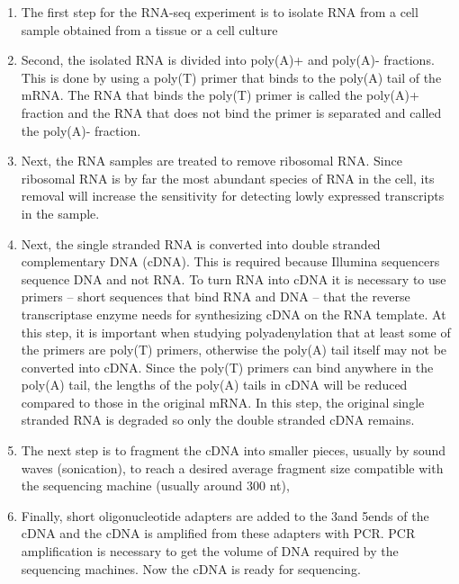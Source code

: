 \begin{enumerate}
	\item The first step for the RNA-seq experiment is to isolate RNA from a
		cell sample obtained from a tissue or a cell culture

	\item Second, the isolated RNA is divided into poly(A)+ and poly(A)-
		fractions. This is done by using a poly(T) primer that binds to the
		poly(A) tail of the mRNA. The RNA that binds the poly(T) primer is
		called the poly(A)+ fraction and the RNA that does not bind the primer
		is separated and called the poly(A)- fraction.

	\item Next, the RNA samples are treated to remove ribosomal RNA. Since
		ribosomal RNA is by far the most abundant species of RNA in the cell,
		its removal will increase the sensitivity for detecting lowly expressed
		transcripts in the sample.

	\item Next, the single stranded RNA is converted into double stranded
		complementary DNA (cDNA). This is required because Illumina sequencers
		sequence DNA and not RNA. To turn RNA into cDNA it is necessary to use
		primers -- short sequences that bind RNA and DNA -- that the reverse
		transcriptase enzyme needs for synthesizing cDNA on the RNA template.
		At this step, it is important when studying polyadenylation that at
		least some of the primers are poly(T) primers, otherwise the poly(A)
		tail itself may not be converted into cDNA. Since the poly(T) primers
		can bind anywhere in the poly(A) tail, the lengths of the poly(A) tails
		in cDNA will be reduced compared to those in the original mRNA. In this
		step, the original single stranded RNA is degraded so only the double
		stranded cDNA remains.

	\item The next step is to fragment the cDNA into smaller pieces, usually by
		sound waves (sonication), to reach a desired average fragment size
		compatible with the sequencing machine (usually around 300 nt),

	\item Finally, short oligonucleotide adapters are added to the 3\ppp and
		5\ppp ends of the cDNA and the cDNA is amplified from these adapters
		with PCR.  PCR amplification is necessary to get the volume of DNA
		required by the sequencing machines. Now the cDNA is ready for
		sequencing.

\end{enumerate}

